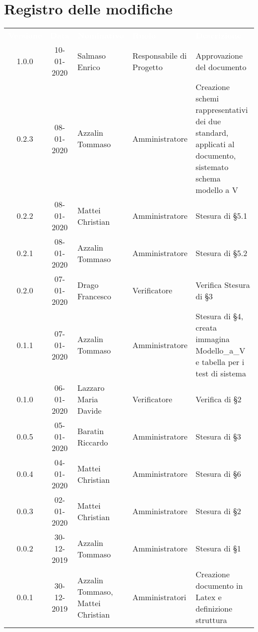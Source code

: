 \section*{Registro delle modifiche}
{
\renewcommand{\arraystretch}{1.5}
\centering
\begin{longtable}{ c c  C{4cm}  C{3cm} C{4cm}}
\textcolor{white}{\textbf{Versione}} & \textcolor{white}{\textbf{Data}} & \textcolor{white}{\textbf{Nominativo}} & \textcolor{white}{\textbf{Ruolo}} & \textcolor{white}{\textbf{Descrizione}}\\	

1.0.0 & 10-01-2020 & Salmaso Enrico & Responsabile di Progetto & Approvazione del documento \\	

0.2.3 & 08-01-2020 & Azzalin Tommaso & Amministratore & Creazione schemi rappresentativi dei due standard, applicati al documento, sistemato schema modello a V \\
0.2.2 & 08-01-2020 & Mattei Christian & Amministratore & Stesura di §5.1 \\
0.2.1 & 08-01-2020 & Azzalin Tommaso & Amministratore & Stesura di §5.2 \\
0.2.0 & 07-01-2020 & Drago Francesco & Verificatore & Verifica Stesura di §3 \\
0.1.1 & 07-01-2020 & Azzalin Tommaso & Amministratore & Stesura di §4, creata immagina Modello\_a\_V e tabella per i test di sistema \\
0.1.0 & 06-01-2020 & Lazzaro Maria Davide & Verificatore & Verifica di §2 \\
0.0.5 & 05-01-2020 & Baratin Riccardo & Amministratore & Stesura di §3 \\
0.0.4 & 04-01-2020 & Mattei Christian & Amministratore & Stesura di §6 \\
0.0.3 & 02-01-2020 & Mattei Christian & Amministratore & Stesura di §2 \\
0.0.2 & 30-12-2019 & Azzalin Tommaso & Amministratore & Stesura di §1 \\
0.0.1 & 30-12-2019 & Azzalin Tommaso, Mattei Christian & Amministratori & Creazione documento in Latex e definizione struttura \\	
		
\end{longtable}
}
